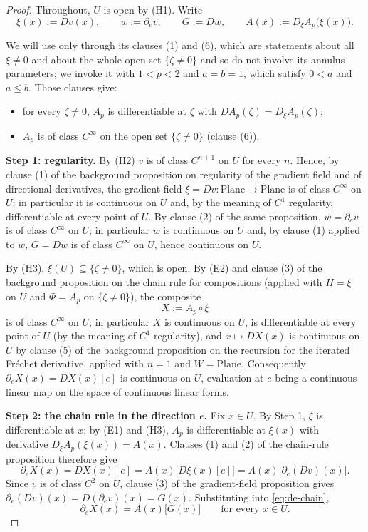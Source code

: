 \begin{proof}
Throughout, $U$ is open by (H1).  Write
\[
  \xi(x):=Dv(x),\qquad w:=\partial_ev,\qquad G:=Dw,\qquad A(x):=D_\xi A_p\bigl(\xi(x)\bigr).
\]

We will use  only through its clauses (1) and (6), which are
statements about all $\xi\ne0$ and about the whole open set $\{\zeta\ne0\}$ and so do not
involve its annulus parameters; we invoke it with $1<p<2$ and $a=b=1$, which satisfy
$0<a$ and $a\le b$.  Those clauses give:
\begin{itemize}
\item[(E1)] for every $\zeta\ne0$, $A_p$ is differentiable at $\zeta$ with
  $DA_p(\zeta)=D_\xi A_p(\zeta)$;
\item[(E2)] $A_p$ is of class $C^{\infty}$ on the open set $\{\zeta\ne0\}$ (clause (6)).
\end{itemize}

\medskip\noindent\textbf{Step 1: regularity.}
By (H2) $v$ is of class $C^{n+1}$ on $U$ for every $n$.  Hence, by clause (1) of the background
proposition on regularity of the gradient field and of directional derivatives, the gradient field
$\xi=Dv\colon\mathrm{Plane}\to\mathrm{Plane}$ is of class $C^{\infty}$ on $U$; in particular it
is continuous on $U$ and, by the meaning of $C^{1}$ regularity, differentiable at every point
of $U$.  By clause (2) of the same
proposition, $w=\partial_ev$ is of class $C^{\infty}$ on $U$; in particular $w$ is continuous on
$U$ and, by clause (1) applied to $w$, $G=Dw$ is of class $C^{\infty}$ on $U$, hence continuous
on $U$.

By (H3), $\xi(U)\subseteq\{\zeta\ne0\}$, which is open.  By (E2) and clause (3) of the
background proposition on the chain rule for compositions (applied with $H=\xi$ on $U$ and
$\Phi=A_p$ on $\{\zeta\ne0\}$), the composite
\[
  X:=A_p\circ\xi
\]
is of class $C^{\infty}$ on $U$; in particular $X$ is continuous on $U$, is differentiable at
every point of $U$ (by the meaning of $C^{1}$ regularity), and $x\mapsto DX(x)$ is continuous
on $U$ by clause (5) of the background proposition on the recursion for the iterated Fr\'echet
derivative, applied with $n=1$ and $W=\mathrm{Plane}$.  Consequently
$\partial_eX(x)=DX(x)[e]$ is continuous on $U$, evaluation at $e$ being a continuous linear map
on the space of continuous linear forms.

\medskip\noindent\textbf{Step 2: the chain rule in the direction $e$.}
Fix $x\in U$.  By Step 1, $\xi$ is differentiable at $x$; by (E1) and (H3), $A_p$ is
differentiable at $\xi(x)$ with derivative $D_\xi A_p(\xi(x))=A(x)$.  Clauses (1) and (2) of
the chain-rule proposition therefore give
\begin{equation}\label{eq:de-chain}
  \partial_eX(x)=DX(x)[e]=A(x)\bigl[D\xi(x)[e]\bigr]=A(x)\bigl[\partial_e(Dv)(x)\bigr].
\end{equation}
Since $v$ is of class $C^{2}$ on $U$, clause (3) of the gradient-field proposition
gives $\partial_e(Dv)(x)=D(\partial_ev)(x)=G(x)$.  Substituting into \eqref{eq:de-chain},
\begin{equation}\label{eq:de-key}
  \partial_eX(x)=A(x)\bigl[G(x)\bigr]\qquad\text{for every }x\in U.
\end{equation}


\end{proof}
